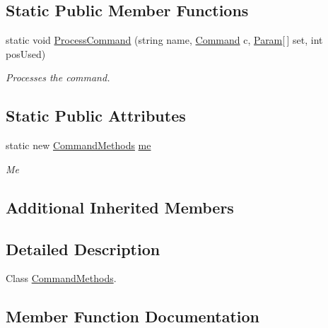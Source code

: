 \subsection*{Static Public Member Functions}
\begin{DoxyCompactItemize}
\item 
static void \hyperlink{class_command_methods_a320048e79589448c4948871452ca4cdb}{Process\+Command} (string name, \hyperlink{class_lerp2_a_p_i_1_1_game_1_1_command}{Command} c, \hyperlink{class_lerp2_a_p_i_1_1_game_1_1_param}{Param}\mbox{[}$\,$\mbox{]} set, int pos\+Used)
\begin{DoxyCompactList}\small\item\em Processes the command. \end{DoxyCompactList}\end{DoxyCompactItemize}
\subsection*{Static Public Attributes}
\begin{DoxyCompactItemize}
\item 
static new \hyperlink{class_command_methods}{Command\+Methods} \hyperlink{class_command_methods_ad364215fd29068b721a90e54780ec364}{me}
\begin{DoxyCompactList}\small\item\em Me \end{DoxyCompactList}\end{DoxyCompactItemize}
\subsection*{Additional Inherited Members}


\subsection{Detailed Description}
Class \hyperlink{class_command_methods}{Command\+Methods}. 



\subsection{Member Function Documentation}
\mbox{\label{class_command_methods_ac8836c23d6d7d6dc387e07200ed966a2}} 
